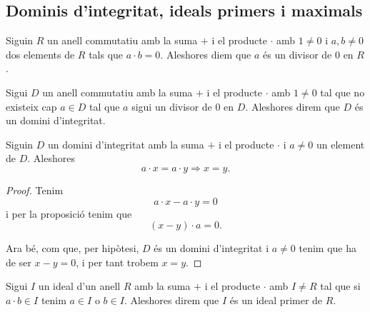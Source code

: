 \documentclass[../Apunts.tex]{subfiles}
\begin{document}
	\subsection{Dominis d'integritat, ideals primers i maximals}
	\begin{definition}[Divisor de 0]
		\label{def:divisor de 0 en un anell}
		Siguin \(R\) un anell commutatiu amb la suma \(+\) i el producte \(\cdot\) amb \(1\neq0\) i \(a,b\neq0\) dos elements de \(R\) tals que \(a\cdot b=0\). Aleshores diem que \(a\) és un divisor de 0 en \(R\).
	\end{definition}
	\begin{definition}
		\label{def:domini d'integritat}
		\label{def:DI}
		Sigui \(D\) un anell commutatiu amb la suma \(+\) i el producte \(\cdot\) amb \(1\neq0\) tal que no existeix cap \(a\in D\) tal que \(a\) sigui un divisor de \(0\) en \(D\). Aleshores direm que \(D\) és un domini d'integritat.
	\end{definition}
	\begin{proposition}
		\label{prop:podem tatxar pels costats en DI}
		Siguin \(D\) un domini d'integritat amb la suma \(+\) i el producte \(\cdot\) i \(a\neq0\) un element de \(D\). Aleshores
		\[a\cdot x=a\cdot y\Longrightarrow x=y.\]
		\begin{proof}
			Tenim
			\[a\cdot x-a\cdot y=0\]
			i per la proposició  tenim que
			\[(x-y)\cdot a=0.\]
			
			Ara bé, com que, per hipòtesi, \(D\) és un domini d'integritat i \(a\neq0\) tenim que ha de ser \(x-y=0\), i per tant trobem \(x=y\).
		\end{proof}
	\end{proposition}
	\begin{definition}
		\label{def:ideal primer}
		Sigui \(I\) un ideal d'un anell \(R\) amb la suma \(+\) i el producte \(\cdot\) amb \(I\neq R\) tal que si \(a\cdot b\in I\) tenim \(a\in I\) o \(b\in I\). Aleshores direm que \(I\) és un ideal primer de \(R\).
	\end{definition}
\end{document}
